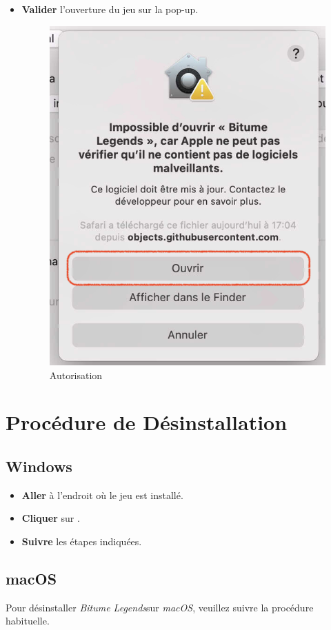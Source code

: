 \documentclass[a4paper,12pt]{article}
\newcommand{\btmlgs}{\textsl{Bitume Legends}}
\begin{document}
\begin{itemize}
            \clearpage
            \item
                \textbf{Valider} l'ouverture du jeu sur la pop-up.\\
                \begin{figure}[h]
                    \centering
                    \includegraphics[scale=1]{ok_mac.png}
                    \caption{Autorisation}
                \end{figure}
        \end{itemize}

    \clearpage
    \section{Procédure de Désinstallation}
        \subsection*{Windows}
            \begin{itemize}
                \item
                    \textbf{Aller} à l'endroit où le jeu est installé.
                \item
                    \textbf{Cliquer} sur .
                \item
                    \textbf{Suivre} les étapes indiquées.
            \end{itemize}
        \subsection*{macOS}
            Pour désinstaller \btmlgs\;sur \textsl{macOS}, veuillez suivre la procédure habituelle.
\end{document}
